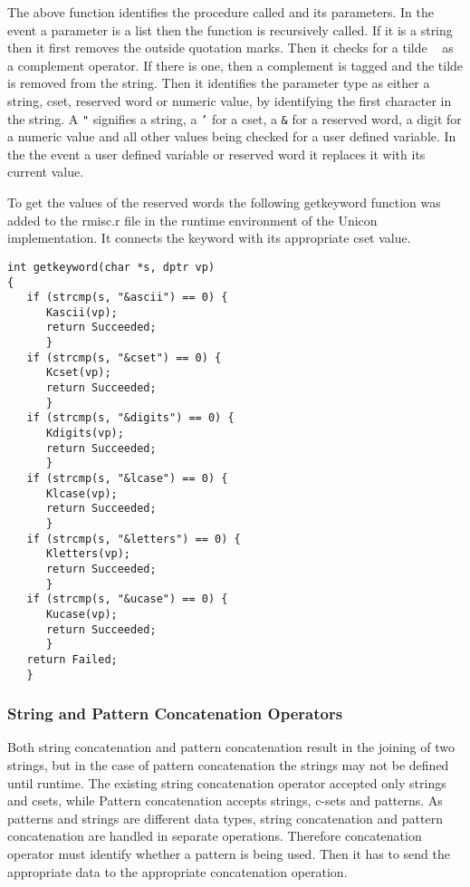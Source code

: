 \documentclass{article}
\begin{document}
The above function identifies the procedure called and its parameters.  In the event a parameter is a list then the function is recursively called.  If it is a string then it first removes the outside quotation marks.  Then it checks for a tilde \texttt{~} as a complement operator.  If there is one, then a complement is tagged and the tilde is removed from the string.  Then it identifies the parameter type as either a string, cset, reserved word or numeric value, by identifying the first character in the string.  A \texttt{"} signifies a string, a \texttt{'} for a cset, a \texttt{\&} for a reserved word, a digit for a numeric value and all other values being checked for a user defined variable.  In the the event a user defined variable or reserved word it replaces it with its current value.

To get the values of the reserved words the following getkeyword function was added to the rmisc.r file in the runtime environment of the Unicon implementation.  It connects the keyword with its appropriate cset value.
\begin{verbatim}
int getkeyword(char *s, dptr vp)
{
   if (strcmp(s, "&ascii") == 0) {
      Kascii(vp);
      return Succeeded;
      }
   if (strcmp(s, "&cset") == 0) {
      Kcset(vp);
      return Succeeded;
      }
   if (strcmp(s, "&digits") == 0) {
      Kdigits(vp);
      return Succeeded;
      }
   if (strcmp(s, "&lcase") == 0) {
      Klcase(vp);
      return Succeeded;
      }
   if (strcmp(s, "&letters") == 0) {
      Kletters(vp);
      return Succeeded;
      }
   if (strcmp(s, "&ucase") == 0) {
      Kucase(vp);
      return Succeeded;
      }
   return Failed;
   }
\end{verbatim}

\subsubsection{String and Pattern Concatenation Operators}
Both string concatenation and pattern concatenation result in the joining of two strings, but in the case of pattern concatenation the strings may not be defined until runtime.  The existing string concatenation operator accepted only strings and csets, while Pattern concatenation accepts strings, c-sets and patterns.  As patterns and strings are different data types, string concatenation and pattern concatenation are handled in separate operations.  Therefore concatenation operator must identify whether a pattern is being used.  Then it has to send the appropriate data to the appropriate concatenation operation.
\end{document}
